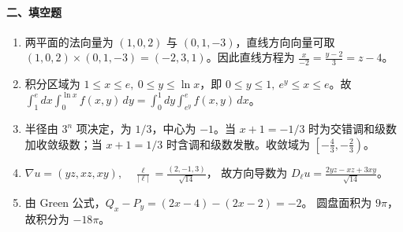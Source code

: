 \paragraph*{二、填空题}
\begin{enumerate}
  \item 两平面的法向量为 $(1,0,2)$ 与 $(0,1,-3)$，直线方向向量可取 \(\displaystyle (1,0,2)\times(0,1,-3)=(-2,3,1)\)。因此直线方程为 \(\displaystyle \frac{x}{-2}=\frac{y-2}{3}=z-4\)。
  \item 积分区域为 $1\le x\le e,\ 0\le y\le\ln x$，即 \(\displaystyle 0\le y\le1,\ e^y\le x\le e\)。故 \(\displaystyle \int_1^e dx\int_0^{\ln x}f(x,y)\,dy=\int_0^1dy\int_{e^y}^e f(x,y)\,dx\)。
  \item 半径由 $3^n$ 项决定，为 $1/3$，中心为 $-1$。当 $x+1=-1/3$ 时为交错调和级数加收敛级数；当 $x+1=1/3$ 时含调和级数发散。收敛域为
  \(\displaystyle \left[-\frac43,-\frac23\right)\)。
  \item \(\displaystyle \nabla u=(yz,xz,xy),\quad \frac{\ell}{|\ell|}=\frac{(2,-1,3)}{\sqrt{14}}\)，
  故方向导数为 \(\displaystyle D_\ell u=\frac{2yz-xz+3xy}{\sqrt{14}}\)。
  \item 由 Green 公式，\(\displaystyle Q_x-P_y=(2x-4)-(2x-2)=-2\)。
  圆盘面积为 $9\pi$，故积分为 \(\displaystyle -18\pi\)。
\end{enumerate}

